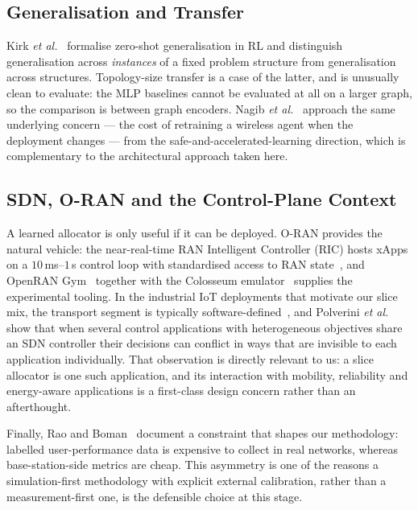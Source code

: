 \documentclass[journal]{IEEEtran}
\begin{document}
\subsection{Generalisation and Transfer}
Kirk \emph{et al.}~\cite{kirk2023zeroshot} formalise zero-shot
generalisation in RL and distinguish generalisation across
\emph{instances} of a fixed problem structure from generalisation
across structures. Topology-size transfer is a case of the latter, and
is unusually clean to evaluate: the MLP baselines cannot be evaluated
at all on a larger graph, so the comparison is between graph encoders.
Nagib \emph{et al.}~\cite{nagib2023safe} approach the same underlying
concern --- the cost of retraining a wireless agent when the deployment
changes --- from the safe-and-accelerated-learning direction, which is
complementary to the architectural approach taken here.

\subsection{SDN, O-RAN and the Control-Plane Context}
A learned allocator is only useful if it can be deployed. O-RAN
provides the natural vehicle: the near-real-time RAN Intelligent
Controller (RIC) hosts xApps on a $10$\,ms--$1$\,s control loop with
standardised access to RAN
state~\cite{polese2023oran,bonati2021intelligence,oran2023wg2},
and OpenRAN Gym~\cite{bonati2023openrangym} together with the
Colosseum emulator~\cite{bonati2021colosseum} supplies the
experimental tooling. In the industrial IoT deployments that motivate
our slice mix, the transport segment is typically
software-defined~\cite{shafiq2024sdniot}, and Polverini \emph{et
al.}~\cite{polverini2026sdnconflicts} show that when several control
applications with heterogeneous objectives share an SDN controller
their decisions can conflict in ways that are invisible to each
application individually. That observation is directly relevant to us:
a slice allocator is one such application, and its interaction with
mobility, reliability and energy-aware applications is a first-class
design concern rather than an afterthought.

Finally, Rao and Boman~\cite{rao2026ssl} document a constraint that
shapes our methodology: labelled user-performance data is expensive to
collect in real networks, whereas base-station-side metrics are cheap.
This asymmetry is one of the reasons a simulation-first methodology
with explicit external calibration, rather than a measurement-first
one, is the defensible choice at this stage.
\end{document}
